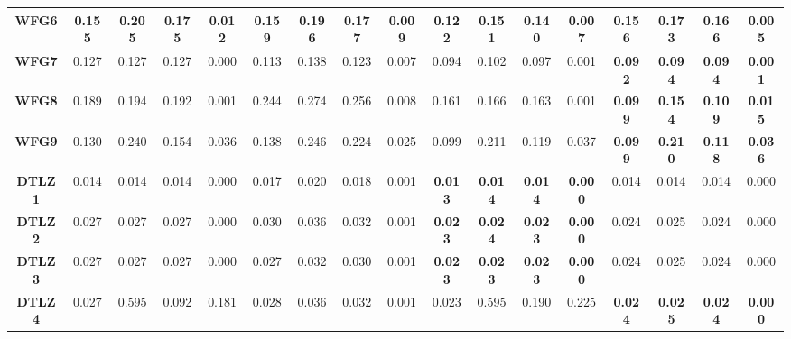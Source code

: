 \begin{table*}[t]
\begin{scriptsize}
\begin{tabular}{cc|c|c|c|c|c|c|c|c|c|c|c|c|c|c|c}
\multicolumn{1}{c|}{\textbf{WFG6}}  & 0.155        & 0.205        & 0.175         & 0.012        & 0.159        & 0.196        & 0.177         & 0.009        & \textbf{0.122} & \textbf{0.151} & \textbf{0.140} & \textbf{0.007} & 0.156          & 0.173          & 0.166          & 0.005          \\ \hline
\multicolumn{1}{c|}{\textbf{WFG7}}  & 0.127        & 0.127        & 0.127         & 0.000        & 0.113        & 0.138        & 0.123         & 0.007        & 0.094          & 0.102          & 0.097          & 0.001          & \textbf{0.092} & \textbf{0.094} & \textbf{0.094} & \textbf{0.001} \\ \hline
\multicolumn{1}{c|}{\textbf{WFG8}}  & 0.189        & 0.194        & 0.192         & 0.001        & 0.244        & 0.274        & 0.256         & 0.008        & 0.161          & 0.166          & 0.163          & 0.001          & \textbf{0.099} & \textbf{0.154} & \textbf{0.109} & \textbf{0.015} \\ \hline
\multicolumn{1}{c|}{\textbf{WFG9}}  & 0.130        & 0.240        & 0.154         & 0.036        & 0.138        & 0.246        & 0.224         & 0.025        & 0.099          & 0.211          & 0.119          & 0.037          & \textbf{0.099} & \textbf{0.210} & \textbf{0.118} & \textbf{0.036} \\ \hline
\multicolumn{1}{c|}{\textbf{DTLZ1}} & 0.014        & 0.014        & 0.014         & 0.000        & 0.017        & 0.020        & 0.018         & 0.001        & \textbf{0.013} & \textbf{0.014} & \textbf{0.014} & \textbf{0.000} & 0.014          & 0.014          & 0.014          & 0.000          \\ \hline
\multicolumn{1}{c|}{\textbf{DTLZ2}} & 0.027        & 0.027        & 0.027         & 0.000        & 0.030        & 0.036        & 0.032         & 0.001        & \textbf{0.023} & \textbf{0.024} & \textbf{0.023} & \textbf{0.000} & 0.024          & 0.025          & 0.024          & 0.000          \\ \hline
\multicolumn{1}{c|}{\textbf{DTLZ3}} & 0.027        & 0.027        & 0.027         & 0.000        & 0.027        & 0.032        & 0.030         & 0.001        & \textbf{0.023} & \textbf{0.023} & \textbf{0.023} & \textbf{0.000} & 0.024          & 0.025          & 0.024          & 0.000          \\ \hline
\multicolumn{1}{c|}{\textbf{DTLZ4}} & 0.027        & 0.595        & 0.092         & 0.181        & 0.028        & 0.036        & 0.032         & 0.001        & 0.023          & 0.595          & 0.190          & 0.225          & \textbf{0.024} & \textbf{0.025} & \textbf{0.024} & \textbf{0.000} \\ \hline

\end{tabular}
\end{scriptsize}
\end{table*}
